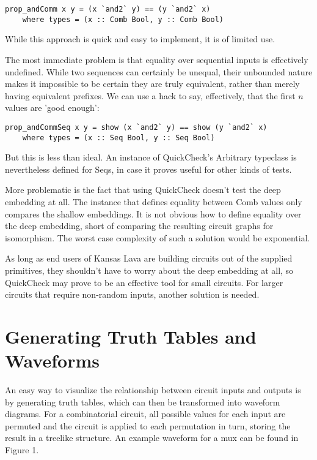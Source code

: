 \documentclass{llncs}
\begin{document}
\begin{verbatim}
prop_andComm x y = (x `and2` y) == (y `and2` x)
    where types = (x :: Comb Bool, y :: Comb Bool)
\end{verbatim}

While this approach is quick and easy to implement, it is of
limited use.

The most immediate problem is that equality over sequential
inputs is effectively undefined. While two sequences can certainly
be unequal, their unbounded nature makes it impossible to be
certain they are truly equivalent, rather than merely having
equivalent prefixes. We can use a hack to say, effectively, that
the first $n$ values are 'good enough':

\begin{verbatim}
prop_andCommSeq x y = show (x `and2` y) == show (y `and2` x)
    where types = (x :: Seq Bool, y :: Seq Bool)
\end{verbatim}

But this is less than ideal. An instance of QuickCheck's Arbitrary
typeclass is nevertheless defined for Seqs, in case it proves
useful for other kinds of tests.

More problematic is the fact that using QuickCheck doesn't test the deep
embedding at all. The instance that defines equality between
Comb values only compares the shallow embeddings. It is
not obvious how to define equality over the deep embedding,
short of comparing the resulting circuit graphs for isomorphism.
The worst case complexity of such a solution would be exponential.

As long as end users of Kansas Lava are building circuits out
of the supplied primitives, they shouldn't have to worry about
the deep embedding at all, so QuickCheck may prove to be an
effective tool for small circuits. For larger circuits that
require non-random inputs, another solution is needed.

\section{Generating Truth Tables and Waveforms}

An easy way to visualize the relationship between circuit inputs and
outputs is by generating truth tables, which can then be transformed
into waveform diagrams. For a combinatorial circuit, all possible
values for each input are permuted and the circuit is applied to each
permutation in turn, storing the result in a treelike structure.
An example waveform for a mux can be found in Figure 1. %
\end{document}
